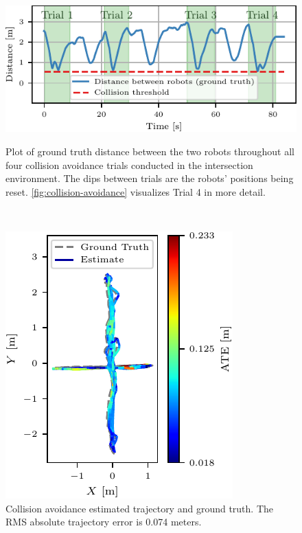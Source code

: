 \begin{figure}[h]
    \centering
    \captionsetup{format=plain}
    \begin{minipage}[b]{0.62\linewidth}
        \centering
        \includegraphics[width=\linewidth]{figures/mar25_1_distance_plot.pdf}

        \caption{Plot of ground truth distance between the two robots throughout all four collision avoidance trials conducted in the intersection environment. The dips between trials are the robots' positions being reset. \autoref{fig:collision-avoidance} visualizes Trial 4 in more detail.}
        \label{fig:collision-avoidance-distance-plot}
    \end{minipage}\hfill%
    ~
    \begin{minipage}[b]{0.34\linewidth}
        \centering
        \includegraphics[width=\linewidth]{figures/mar25_1_trajectory.pdf}
        \caption{Collision avoidance estimated trajectory and ground truth. The RMS absolute trajectory error is 0.074 meters.}
        \label{fig:collision-avoidance-traj}
    \end{minipage}
\end{figure}

